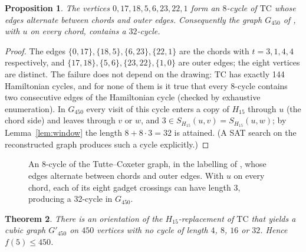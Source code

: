 \documentclass[11pt]{article}
\newtheorem{theorem}{Theorem}[section]
\newtheorem{proposition}[theorem]{Proposition}
\theoremstyle{remark}
\theoremstyle{definition}
\newcommand{\TC}{\mathrm{TC}}
\begin{document}
\begin{proposition}\label{prop:exoo}
The vertices $0,17,18,5,6,23,22,1$ form an $8$-cycle of $\TC$ whose edges alternate between chords and outer edges. Consequently the graph $G_{450}$ of \cite{Exoo}, with $u$ on every chord, contains a $32$-cycle.
\end{proposition}

\begin{proof}
The edges $\{0,17\},\{18,5\},\{6,23\},\{22,1\}$ are the chords with $t=3,1,4,4$ respectively, and $\{17,18\},\{5,6\},\{23,22\},\{1,0\}$ are outer edges; the eight vertices are distinct. The failure does not depend on the drawing: $\TC$ has exactly 144 Hamiltonian cycles, and for none of them is it true that every 8-cycle contains two consecutive edges of the Hamiltonian cycle (checked by exhaustive enumeration). In $G_{450}$ every visit of this cycle enters a copy of $H_{15}$ through $u$ (the chord side) and leaves through $v$ or $w$, and $3\in S_{H_{15}}(u,v)=S_{H_{15}}(u,w)$; by Lemma~\ref{lem:window} the length $8+8\cdot 3=32$ is attained. (A SAT search on the reconstructed graph produces such a cycle explicitly.)
\end{proof}

\begin{figure}[ht]
\centering
{}
\caption{An 8-cycle of the Tutte--Coxeter graph, in the labelling of \cite{Exoo}, whose edges alternate between chords and outer edges. With $u$ on every chord, each of its eight gadget crossings can have length 3, producing a 32-cycle in $G_{450}$.}
\label{fig:alt}
\end{figure}

\begin{theorem}\label{thm:450}
There is an orientation of the $H_{15}$-replacement of $\TC$ that yields a cubic graph $G'_{450}$ on $450$ vertices with no cycle of length $4$, $8$, $16$ or $32$. Hence $f(5)\le 450$.
\end{theorem}
\end{document}
